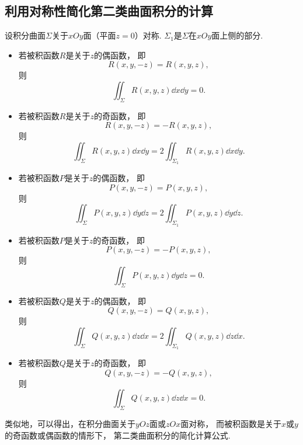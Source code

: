 \subsection{利用对称性简化第二类曲面积分的计算}
设积分曲面\(\Sigma\)关于\(xOy\)面（平面\(z=0\)）对称.
\(\Sigma_1\)是\(\Sigma\)在\(xOy\)面上侧的部分.
\begin{itemize}
	\item 若被积函数\(R\)是关于\(z\)的偶函数，
	即\begin{equation*}
		R(x,y,-z) = R(x,y,z),
	\end{equation*}
	则\begin{equation*}
		\iint_\Sigma R(x,y,z) \dd{x}\dd{y} = 0.
	\end{equation*}

	\item 若被积函数\(R\)是关于\(z\)的奇函数，
	即\begin{equation*}
		R(x,y,-z) = -R(x,y,z),
	\end{equation*}
	则\begin{equation*}
		\iint_\Sigma R(x,y,z) \dd{x}\dd{y}
		= 2 \iint_{\Sigma_1} R(x,y,z) \dd{x}\dd{y}.
	\end{equation*}

	\item 若被积函数\(P\)是关于\(z\)的偶函数，
	即\begin{equation*}
		P(x,y,-z) = P(x,y,z),
	\end{equation*}
	则\begin{equation*}
		\iint_\Sigma P(x,y,z) \dd{y}\dd{z}
		= 2\iint_{\Sigma_1} P(x,y,z) \dd{y}\dd{z}.
	\end{equation*}

	\item 若被积函数\(P\)是关于\(z\)的奇函数，
	即\begin{equation*}
		P(x,y,-z) = -P(x,y,z),
	\end{equation*}
	则\begin{equation*}
		\iint_\Sigma P(x,y,z) \dd{y}\dd{z} = 0.
	\end{equation*}

	\item 若被积函数\(Q\)是关于\(z\)的偶函数，
	即\begin{equation*}
		Q(x,y,-z) = Q(x,y,z),
	\end{equation*}
	则\begin{equation*}
		\iint_\Sigma Q(x,y,z) \dd{z}\dd{x}
		= 2\iint_{\Sigma_1} Q(x,y,z) \dd{z}\dd{x}.
	\end{equation*}

	\item 若被积函数\(Q\)是关于\(z\)的奇函数，
	即\begin{equation*}
		Q(x,y,-z) = -Q(x,y,z),
	\end{equation*}
	则\begin{equation*}
		\iint_\Sigma Q(x,y,z) \dd{z}\dd{x} = 0.
	\end{equation*}
\end{itemize}

类似地，可以得出，在积分曲面关于\(yOz\)面或\(zOx\)面对称，
而被积函数是关于\(x\)或\(y\)的奇函数或偶函数的情形下，
第二类曲面积分的简化计算公式.
